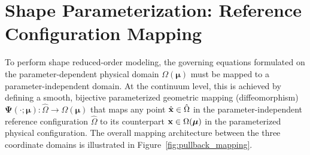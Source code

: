 \chapter{Shape Parameterization: Reference Configuration Mapping}
\label{ch:pullback}

To perform shape reduced-order modeling, the governing equations formulated on the parameter-dependent physical domain $\Omega(\boldsymbol{\mu})$ must be mapped to a parameter-independent domain. At the continuum level, this is achieved by defining a smooth, bijective parameterized geometric mapping (diffeomorphism) $\boldsymbol{\Psi}(\cdot; \boldsymbol{\mu}) : \hat{\Omega} \to \Omega(\boldsymbol{\mu})$ that maps any point $\hat{\mathbf{x}} \in \hat{\Omega}$ in the parameter-independent reference configuration $\hat{\Omega}$ to its counterpart $\mathbf{x} \in \Omega(\boldsymbol{\mu})$ in the parameterized physical configuration. The overall mapping architecture between the three coordinate domains is illustrated in Figure~\ref{fig:pullback_mapping}.

